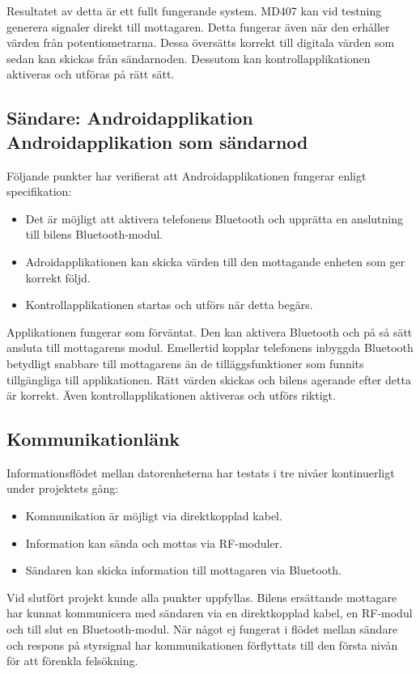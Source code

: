 \documentclass[a4paper]{article}
\begin{document}
\noindent
Resultatet av detta är ett fullt fungerande system. MD407 kan vid testning generera signaler direkt till mottagaren. Detta fungerar även när den erhåller värden från potentiometrarna. Dessa översätts korrekt till digitala värden som sedan kan skickas från sändarnoden. Dessutom kan kontrollapplikationen aktiveras och utföras på rätt sätt.


\subsection{Sändare: Androidapplikation \\ Androidapplikation som sändarnod}
Följande punkter har verifierat att Androidapplikationen fungerar enligt specifikation:

\begin{itemize}
\item Det är möjligt att aktivera telefonens Bluetooth och upprätta en anslutning till bilens Bluetooth-modul.
\item Adroidapplikationen kan skicka värden till den mottagande enheten som ger korrekt följd.
\item Kontrollapplikationen startas och utförs när detta begärs.
\end{itemize}

\noindent
Applikationen fungerar som förväntat. Den kan aktivera Bluetooth och på så sätt ansluta till mottagarens modul. Emellertid kopplar telefonens inbyggda Bluetooth betydligt snabbare till mottagarens än de tilläggsfunktioner som funnits tillgängliga till applikationen. Rätt värden skickas och bilens agerande efter detta är korrekt. Även kontrollapplikationen aktiveras och utförs riktigt.

\subsection{Kommunikationlänk}
Informationsflödet mellan datorenheterna har testats i tre nivåer kontinuerligt under projektets gång:
\begin{itemize}
\item Kommunikation är möjligt via direktkopplad kabel.
\item Information kan sända och mottas via RF-moduler.
\item Sändaren kan skicka information till mottagaren via Bluetooth.
\end{itemize}

\noindent
Vid slutfört projekt kunde alla punkter uppfyllas. Bilens ersättande mottagare har kunnat kommunicera med sändaren via en direktkopplad kabel, en RF-modul och till slut en Bluetooth-modul. När något ej fungerat i flödet mellan sändare och respons på styrsignal har kommunikationen förflyttats till den första nivån för att förenkla felsökning.
\end{document}
